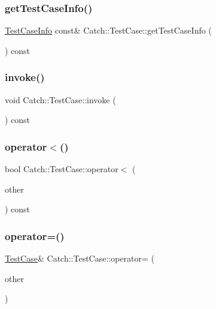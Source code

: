 \subsubsection{\texorpdfstring{get\+Test\+Case\+Info()}{getTestCaseInfo()}}
{\footnotesize\ttfamily \hyperlink{struct_catch_1_1_test_case_info}{Test\+Case\+Info} const\& Catch\+::\+Test\+Case\+::get\+Test\+Case\+Info (\begin{DoxyParamCaption}{ }\end{DoxyParamCaption}) const}

\hypertarget{class_catch_1_1_test_case_a26f346c8446dded0562fe3818ae71651}{}\label{class_catch_1_1_test_case_a26f346c8446dded0562fe3818ae71651} 
\subsubsection{\texorpdfstring{invoke()}{invoke()}}
{\footnotesize\ttfamily void Catch\+::\+Test\+Case\+::invoke (\begin{DoxyParamCaption}{ }\end{DoxyParamCaption}) const}

\hypertarget{class_catch_1_1_test_case_a030e4b9282e9b32e08c8bd5e5cd6fa98}{}\label{class_catch_1_1_test_case_a030e4b9282e9b32e08c8bd5e5cd6fa98} 
\subsubsection{\texorpdfstring{operator$<$()}{operator<()}}
{\footnotesize\ttfamily bool Catch\+::\+Test\+Case\+::operator$<$ (\begin{DoxyParamCaption}\item[{\hyperlink{class_catch_1_1_test_case}{Test\+Case} const \&}]{other }\end{DoxyParamCaption}) const}

\hypertarget{class_catch_1_1_test_case_a8022e3f74232f7887d2d2cbbc8876502}{}\label{class_catch_1_1_test_case_a8022e3f74232f7887d2d2cbbc8876502} 
\subsubsection{\texorpdfstring{operator=()}{operator=()}}
{\footnotesize\ttfamily \hyperlink{class_catch_1_1_test_case}{Test\+Case}\& Catch\+::\+Test\+Case\+::operator= (\begin{DoxyParamCaption}\item[{\hyperlink{class_catch_1_1_test_case}{Test\+Case} const \&}]{other }\end{DoxyParamCaption})}

